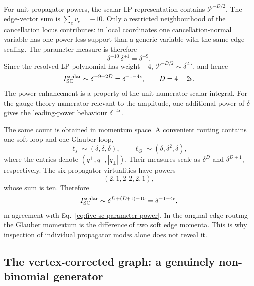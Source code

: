 \documentclass[a4paper,11pt]{article}
\begin{document}
For unit propagator powers, the scalar LP representation contains
\(\mathcal P^{-D/2}\).  The edge-vector sum is
\(\sum_e v_e=-10\).  Only a restricted neighbourhood of the cancellation
locus contributes: in local coordinates one cancellation-normal variable
has one power less support than a generic variable with the same edge
scaling.  The parameter measure is therefore
\begin{equation}
 \delta^{-10}\,\delta^{+1}=\delta^{-9}.
 \label{eq:five-sc-parameter-measure}
\end{equation}
Since the resolved LP polynomial has weight \(-4\),
\(\mathcal P^{-D/2}\sim\delta^{2D}\), and hence
\begin{equation}
 I_{\rm SC}^{\rm scalar}\sim
 \delta^{-9+2D}=\delta^{-1-4\epsilon},
 \qquad D=4-2\epsilon.
 \label{eq:five-sc-parameter-power}
\end{equation}
The power enhancement is a property of the unit-numerator scalar integral.
For the gauge-theory numerator relevant to the amplitude, one additional
power of \(\delta\) gives the leading-power behaviour
\(\delta^{-4\epsilon}\).

The same count is obtained in momentum space.  A convenient routing contains
one soft loop and one Glauber loop,
\begin{equation}
 \ell_s\sim(\delta,\delta,\delta),
 \qquad
 \ell_G\sim(\delta,\delta^2,\delta),
 \label{eq:five-sc-modes}
\end{equation}
where the entries denote \((q^+,q^-,|q_\perp|)\).  Their measures scale as
\(\delta^D\) and \(\delta^{D+1}\), respectively.  The six propagator
virtualities have powers
\begin{equation}
 (2,1,2,2,2,1),
 \label{eq:five-sc-virtualities}
\end{equation}
whose sum is ten.  Therefore
\begin{equation}
 I_{\rm SC}^{\rm scalar}\sim
 \delta^{D+(D+1)-10}=\delta^{-1-4\epsilon},
 \label{eq:five-sc-momentum-power}
\end{equation}
in agreement with Eq.~\eqref{eq:five-sc-parameter-power}.  In the original
edge routing the Glauber momentum is the difference of two soft edge
momenta.  This is why inspection of individual propagator modes alone does
not reveal it.

\subsection{The vertex-corrected graph: a genuinely non-binomial generator}
\end{document}

